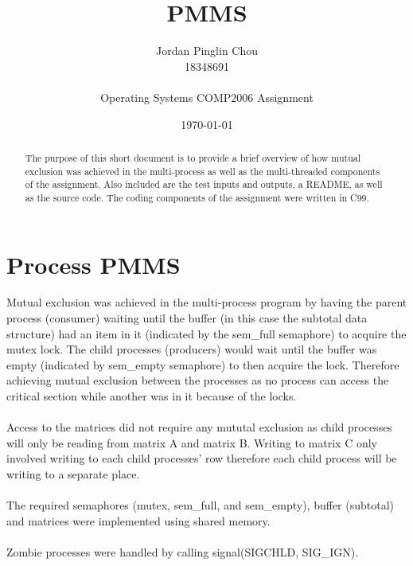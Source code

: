 \documentclass{article}
\begin{document}
\author{Jordan Pinglin Chou\\
  18348691\\\\
  Operating Systems COMP2006 Assignment\\}
\date{\today}
\title{PMMS}
\maketitle
\pagebreak
\begin{abstract}
  The purpose of this short document is to provide a brief overview of
  how mutual exclusion was achieved in the multi-process as well as
  the multi-threaded components of the assignment. Also included are
  the test inputs and outputs, a README, as well as the source code. The coding
  components of the assignment were written in C99.
\end{abstract}

\section{Process PMMS}
Mutual exclusion was achieved in the multi-process program by having the parent
process (consumer) waiting until the buffer (in this case the subtotal data structure)
had an item in it (indicated by the sem\_full semaphore) to acquire the mutex lock.
The child processes (producers) would wait until the buffer was empty (indicated
by sem\_empty semaphore) to then acquire the lock. Therefore achieving mutual
exclusion between the processes as no process can access the critical section
while another was in it because of the locks.
\\\\
Access to the matrices did not require any mututal exclusion as child processes
will only be reading from matrix A and matrix B. Writing to matrix C only
involved writing to each child processes’ row therefore each child process will
be writing to a separate place.
\\\\
The required semaphores (mutex, sem\_full, and sem\_empty), buffer (subtotal) and
matrices were implemented using shared memory.
\\\\
Zombie processes were handled by calling signal(SIGCHLD, SIG\_IGN).
\\
\end{document}
